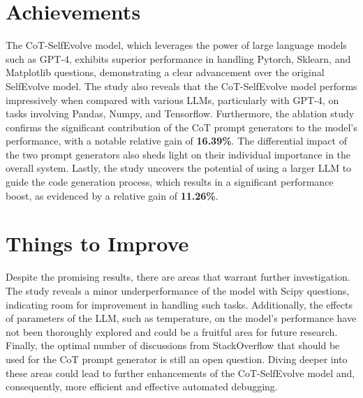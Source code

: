 \documentclass[a4paper,oneside]{book}
\begin{document}
\section{Achievements}
The CoT-SelfEvolve model, which leverages the power of large language models such as GPT-4, exhibits superior performance in handling Pytorch, Sklearn, and Matplotlib questions, demonstrating a clear advancement over the original SelfEvolve model. The study also reveals that the CoT-SelfEvolve model performs impressively when compared with various LLMs, particularly with GPT-4, on tasks involving Pandas, Numpy, and Tensorflow. Furthermore, the ablation study confirms the significant contribution of the CoT prompt generators to the model's performance, with a notable relative gain of \textbf{16.39\%}. The differential impact of the two prompt generators also sheds light on their individual importance in the overall system. Lastly, the study uncovers the potential of using a larger LLM to guide the code generation process, which results in a significant performance boost, as evidenced by a relative gain of \textbf{11.26\%}.

\section{Things to Improve}
Despite the promising results, there are areas that warrant further investigation. The study reveals a minor underperformance of the model with Scipy questions, indicating room for improvement in handling such tasks. Additionally, the effects of parameters of the LLM, such as temperature, on the model's performance have not been thoroughly explored and could be a fruitful area for future research. Finally, the optimal number of discussions from StackOverflow that should be used for the CoT prompt generator is still an open question. Diving deeper into these areas could lead to further enhancements of the CoT-SelfEvolve model and, consequently, more efficient and effective automated debugging.

\newpage
\appendix
\end{document}
